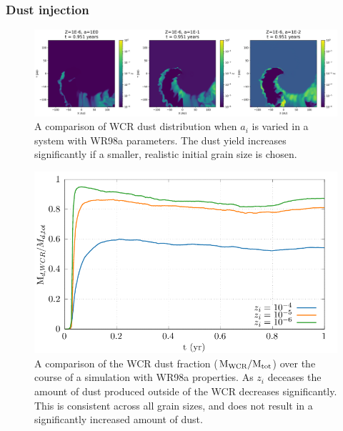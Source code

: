 \subsubsection{Dust injection}
\label{sec:injection}

\begin{figure}[ht]
  \centering
  \includegraphics[width=\linewidth]{assets/a_z_tweaking/zconcat.png}
  \caption[$z_i$ testing]{A comparison of WCR dust distribution when $a_i$ is varied in a system with WR98a parameters. The dust yield increases significantly if a smaller, realistic initial grain size is chosen.}
  \label{fig:azweak_img}
\end{figure}

\begin{figure}[ht]
  \centering
  \includegraphics{assets/a_z_tweaking/wcrratio.pdf}
  \caption[WCR dust fraction testing comparison]{A comparison of the WCR dust fraction ($\text{M}_\text{WCR}/\text{M}_\text{tot}$) over the course of a simulation with WR98a properties. As $z_i$ deceases the amount of dust produced outside of the WCR decreases significantly. This is consistent across all grain sizes, and does not result in a significantly increased amount of dust.}
  \label{fig:aztwek_wcrrat}
\end{figure}


